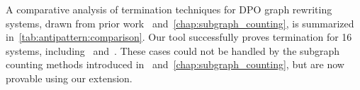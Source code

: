 
 

 




A comparative analysis of termination techniques for DPO graph rewriting systems, drawn from prior work~\cite{plump1995ontermination,plump2018modular,bruggink2014termination,bruggink2015proving,endrullis2024generalized_arxiv_v2,
overbeek2024termination_lmcs} and~\autoref{chap:subgraph_counting}, is summarized in~\autoref{tab:antipattern:comparison}. 
Our tool successfully proves termination for 16 systems, including~\cite[Example D.3]{endrullis2024generalized_arxiv_v2} and~\cite[Example 1]{bruggink2014termination}. These cases could not be handled by the subgraph counting methods introduced in~\cite{overbeek2024termination_lmcs} and~\autoref{chap:subgraph_counting}, but are now provable using our extension.
 
